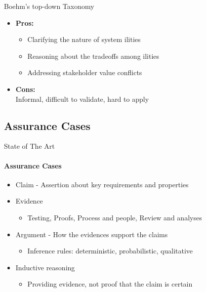 \documentclass[xcolor=x11names,compress]{beamer}
\renewcommand{\(}{\begin{columns}}
\renewcommand{\)}{\end{columns}}
\newcommand{\<}[1]{\begin{column}{#1}}
\renewcommand{\>}{\end{column}}
\begin{document}

\begin{frame}{Boehm's top-down Taxonomy}
\begin{itemize}
\item \textbf{Pros:}
	\begin{itemize}
		\item Clarifying the nature of system ilities
		\item Reasoning about the tradeoffs among ilities
		\item Addressing stakeholder value conflicts
	\end{itemize}
\item \textbf{Cons:}\\
	Informal, difficult to validate, hard to apply
\end{itemize}
\end{frame}

\subsection{Assurance Cases}
\begin{frame}{State of The Art}
\framesubtitle{Assurance Cases}
\begin{itemize}
	\item Claim - Assertion about key requirements and properties
    \item Evidence
	    \begin{itemize}
    		\item Testing, Proofs, Process and people, Review and analyses
	    \end{itemize}
    \item Argument - How the evidences support the claims
    \begin{itemize}
    	\item Inference rules: deterministic, probabilistic, qualitative
    \end{itemize}
    \item Inductive reasoning
    	\begin{itemize}
       	\item Providing evidence, not proof that the claim is certain
      	\end{itemize}
\end{itemize}
\end{frame}
\end{document}
